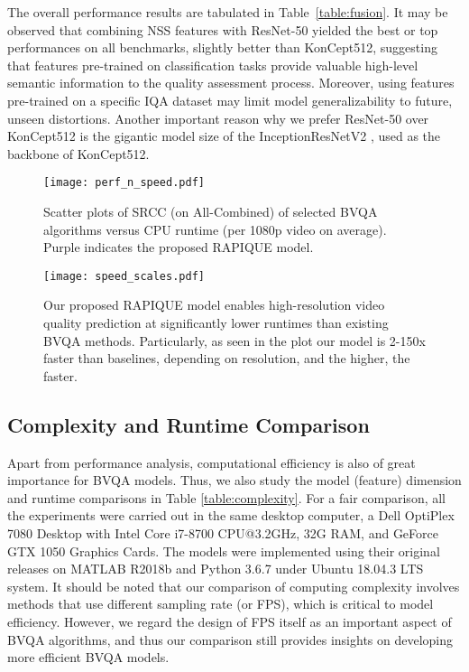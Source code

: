 \documentclass[transmag]{IEEEtran}
\begin{document}
The overall performance results are tabulated in Table~\ref{table:fusion}. It may be observed that combining NSS features with ResNet-50 yielded the best or top performances on all benchmarks, slightly better than KonCept512, suggesting that features pre-trained on classification tasks provide valuable high-level semantic information to the quality assessment process. Moreover, using features pre-trained on a specific IQA dataset may limit model generalizability to future, unseen distortions. Another important reason why we prefer ResNet-50 over KonCept512 is the gigantic model size of the InceptionResNetV2 \cite{szegedy2017inception}, used as the backbone of KonCept512.

\begin{figure}[!t]
\centering
\texttt{[image: perf\_n\_speed.pdf]}
\caption{Scatter plots of SRCC (on All-Combined) of selected BVQA algorithms versus CPU runtime (per 1080p video on average). Purple indicates the proposed RAPIQUE model.}
\label{fig:perf_n_speed}
\end{figure}

\begin{figure}[!t]
\centering
\texttt{[image: speed\_scales.pdf]}
\caption{Our proposed RAPIQUE model enables high-resolution video quality prediction at significantly lower runtimes than existing BVQA methods. Particularly, as
seen in the plot our model is 2-150x faster than baselines, depending on resolution, and the higher, the faster.}
\label{fig:speed_scales}
\end{figure}

\subsection{Complexity and Runtime Comparison}
\label{ssec:runtime_comparison}

Apart from performance analysis, computational efficiency is also of great importance for BVQA models. Thus, we also study the model (feature) dimension and runtime comparisons in Table \ref{table:complexity}. For a fair comparison, all the experiments were carried out in the same desktop computer, a Dell OptiPlex 7080 Desktop with Intel Core i7-8700 CPU@3.2GHz, 32G RAM, and GeForce GTX 1050 Graphics Cards. The models were implemented using their original releases on MATLAB R2018b and Python 3.6.7 under Ubuntu 18.04.3 LTS system. It should be noted that our comparison of computing complexity involves methods that use different sampling rate (or FPS), which is critical to model efficiency. However, we regard the design of FPS itself as an important aspect of BVQA algorithms, and thus our comparison still provides insights on developing more efficient BVQA models.
\end{document}
